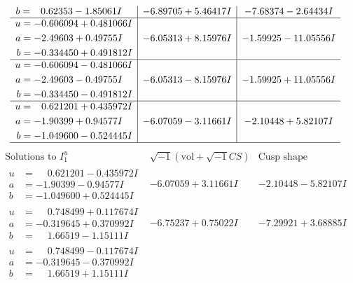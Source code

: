 \documentclass[1p]{elsarticle_modified}
\theoremstyle{definition}
\newcommand{\I}{\sqrt{-1}}
\begin{document}
$$\begin{array}{c|c|c}
\begin{aligned}
b &= \phantom{-}0.62353 - 1.85061 I\end{aligned}
 & -6.89705 + 5.46417 I & -7.68374 - 2.64434 I \\ \hline\begin{aligned}
u &= -0.606094 + 0.481066 I \\
a &= -2.49603 + 0.49755 I \\
b &= -0.334450 + 0.491812 I\end{aligned}
 & -6.05313 + 8.15976 I & -1.59925 - 11.05556 I \\ \hline\begin{aligned}
u &= -0.606094 - 0.481066 I \\
a &= -2.49603 - 0.49755 I \\
b &= -0.334450 - 0.491812 I\end{aligned}
 & -6.05313 - 8.15976 I & -1.59925 + 11.05556 I \\ \hline\begin{aligned}
u &= \phantom{-}0.621201 + 0.435972 I \\
a &= -1.90399 + 0.94577 I \\
b &= -1.049600 - 0.524445 I\end{aligned}
 & -6.07059 - 3.11661 I & -2.10448 + 5.82107 I\\
 \hline 
 \end{array}$$\newpage$$\begin{array}{c|c|c}  
\text{Solutions to }I^u_{1}& \I (\text{vol} + \sqrt{-1}CS) & \text{Cusp shape}\\
 \hline 
\begin{aligned}
u &= \phantom{-}0.621201 - 0.435972 I \\
a &= -1.90399 - 0.94577 I \\
b &= -1.049600 + 0.524445 I\end{aligned}
 & -6.07059 + 3.11661 I & -2.10448 - 5.82107 I \\ \hline\begin{aligned}
u &= \phantom{-}0.748499 + 0.117674 I \\
a &= -0.319645 + 0.370992 I \\
b &= \phantom{-}1.66519 - 1.15111 I\end{aligned}
 & -6.75237 + 0.75022 I & -7.29921 + 3.68885 I \\ \hline\begin{aligned}
u &= \phantom{-}0.748499 - 0.117674 I \\
a &= -0.319645 - 0.370992 I \\
b &= \phantom{-}1.66519 + 1.15111 I\end{aligned}

\end{array}$$
\end{document}
